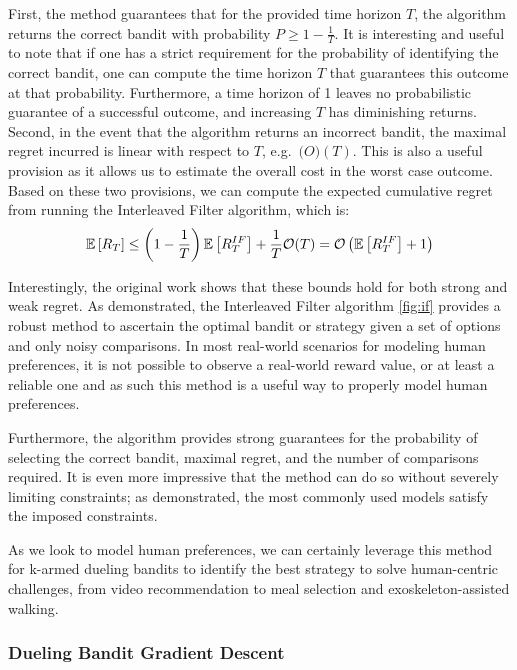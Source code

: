 \documentclass[
  letterpaper,
  DIV=11,
  numbers=noendperiod,
  oneside]{scrreprt}
\theoremstyle{remark}
\begin{document}
First, the method guarantees that for the provided time horizon \(T\),
the algorithm returns the correct bandit with probability
\(P \ge 1 - \frac{1}{T}\). It is interesting and useful to note that if
one has a strict requirement for the probability of identifying the
correct bandit, one can compute the time horizon \(T\) that guarantees
this outcome at that probability. Furthermore, a time horizon of 1
leaves no probabilistic guarantee of a successful outcome, and
increasing \(T\) has diminishing returns. Second, in the event that the
algorithm returns an incorrect bandit, the maximal regret incurred is
linear with respect to \(T\), e.g.~\(\mathcal(O)(T)\). This is also a
useful provision as it allows us to estimate the overall cost in the
worst case outcome. Based on these two provisions, we can compute the
expected cumulative regret from running the Interleaved Filter
algorithm, which is:
\[\mathbb{E}\left[R_T\right] \le \left(1 - \frac{1}{T}\right) \mathbb{E}\left[ R_T^{IF} \right] + \frac{1}{T}\mathcal{O}(T) \\
= \mathcal{O}\left(\mathbb{E}\left[ R_T^{IF} \right] + 1\right)\]

Interestingly, the original work shows that these bounds hold for both
strong and weak regret. As demonstrated, the Interleaved Filter
algorithm \hyperref[fig:if]{{[}fig:if{]}} provides a robust method to
ascertain the optimal bandit or strategy given a set of options and only
noisy comparisons. In most real-world scenarios for modeling human
preferences, it is not possible to observe a real-world reward value, or
at least a reliable one and as such this method is a useful way to
properly model human preferences.

Furthermore, the algorithm provides strong guarantees for the
probability of selecting the correct bandit, maximal regret, and the
number of comparisons required. It is even more impressive that the
method can do so without severely limiting constraints; as demonstrated,
the most commonly used models satisfy the imposed constraints.

As we look to model human preferences, we can certainly leverage this
method for k-armed dueling bandits to identify the best strategy to
solve human-centric challenges, from video recommendation to meal
selection and exoskeleton-assisted walking.

\subsubsection{Dueling Bandit Gradient
Descent}\label{dueling-bandit-gradient-descent}
\end{document}
